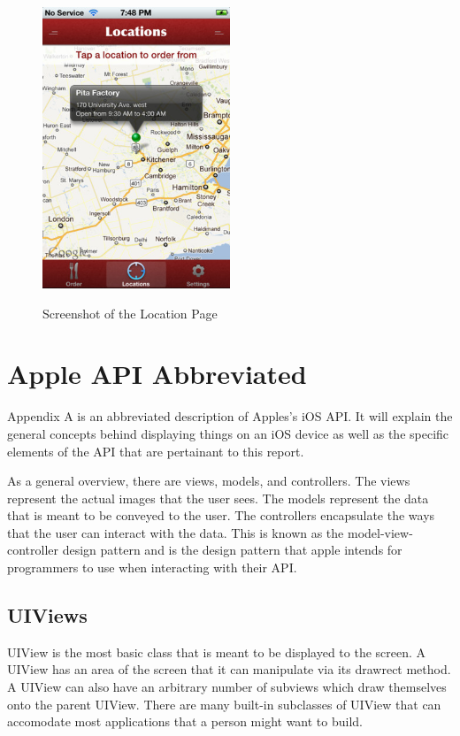 \documentclass[se]{uw-wkrpt}
\begin{document}
\begin{figure}[h!]
  \caption{Screenshot of the Location Page}
  \centering
    \includegraphics[width=0.5\textwidth]{locationPage}
  \label{fig:Location Pageg}
\end{figure}

\appendix

\section{Apple API Abbreviated}

Appendix A is an abbreviated description of Apples's iOS API. It
will explain the general concepts behind displaying things on
an iOS device as well as the specific elements of the API that
are pertainant to this report.

As a general overview, there are views, models, and controllers.
The views represent the actual images that the user sees. The models
represent the data that is meant to be conveyed to the user. The
controllers encapsulate the ways that the user can interact with
the data. This is known as the model-view-controller design pattern
and is the design pattern that apple intends for programmers to use
when interacting with their API.

\subsection{UIViews}

UIView is the most basic class that is meant to be displayed to
the screen. A UIView has an area of the screen that it can manipulate
via its drawrect method. A UIView can also have an arbitrary number of 
subviews which draw themselves onto the parent UIView. There are 
many built-in subclasses of UIView that can accomodate most 
applications that a person might want to build.
\end{document}
